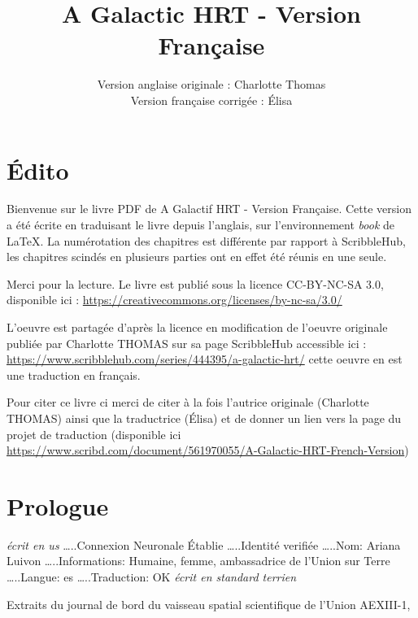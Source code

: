 \documentclass[12pt,hidelinks,a4paper]{book}
\title{A Galactic HRT - Version Française}
\author{Version anglaise originale : Charlotte Thomas \\ Version française corrigée : Élisa}
\begin{document}
\maketitle 
\tableofcontents

\chapter*{Édito}

Bienvenue sur le livre PDF de A Galactif HRT - Version Française. Cette version a été
écrite en traduisant le livre depuis l'anglais, sur l'environnement
\textit{book} de \LaTeX .
\bigskip
La numérotation des chapitres est différente par rapport à ScribbleHub,
les chapitres scindés en plusieurs parties ont en effet été réunis
en une seule.

\bigskip
Merci pour la lecture. Le livre est publié sous la licence CC-BY-NC-SA
3.0, disponible ici : \url{https://creativecommons.org/licenses/by-nc-sa/3.0/}

L'oeuvre est partagée d'après la licence en modification de l'oeuvre originale publiée par 
Charlotte THOMAS sur sa page ScribbleHub accessible ici : \url{https://www.scribblehub.com/series/444395/a-galactic-hrt/} cette 
oeuvre en est une traduction en français. \par
\bigskip

Pour citer ce livre ci merci de citer à la fois l'autrice originale (Charlotte THOMAS) ainsi que 
la traductrice (Élisa) et de donner un lien vers la page du projet de traduction (disponible ici \url{https://www.scribd.com/document/561970055/A-Galactic-HRT-French-Version})


\chapter*{Prologue}

\textit{écrit en \gls{us}}\newline
…..Connexion Neuronale Établie\newline
…..Identité verifiée\newline
…..Nom: Ariana Luivon\newline
…..Informations: Humaine, femme, ambassadrice de l'Union sur Terre\newline
…..Langue: \gls{es}\newline
…..Traduction: OK\newline
\textit{écrit en standard terrien}\par
\bigskip

Extraits du journal de bord du vaisseau spatial scientifique de l'Union
AEXIII-1,
\end{document}
